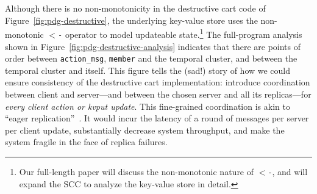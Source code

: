 

Although there is no
non-monotonicity in the destructive
cart code of Figure~\ref{fig:pdg-destructive}, the underlying key-value store
uses the non-monotonic \texttt{$<$-} operator to model updateable
state.\footnote{Our full-length paper will discuss the non-monotonic nature of \texttt{$<$-}, and
will expand the SCC to analyze the key-value store in detail.}
The full-program analysis shown in Figure~\ref{fig:pdg-destructive-analysis}
indicates that there are
points of order between \texttt{action\_msg}, \texttt{member} and the temporal cluster,
and between the temporal cluster and itself.
This figure tells the (sad!) story of how we could ensure consistency of the destructive cart implementation: introduce coordination
between client and server---and between the chosen server and all its replicas---for {\em every client action or kvput update}.  This fine-grained coordination is akin to ``eager replication''~\cite{dangers}. It would incur the latency of a round of messages per server per client update, substantially decrease system throughput, and make the system fragile in the face of replica failures.

